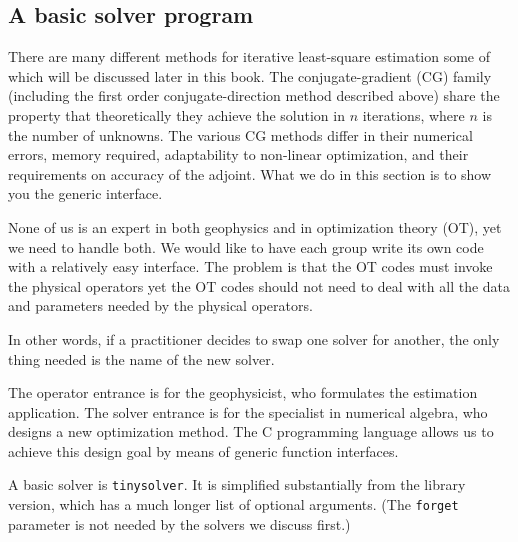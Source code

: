 \subsection{A basic solver program}
There are many different methods for iterative least-square estimation
some of which will be discussed later in this book.
The conjugate-gradient (CG) family
(including the first order conjugate-direction method described above)
share the property that theoretically they achieve the solution
in $n$ iterations, where $n$ is the number of unknowns.
The various CG methods differ
in their numerical errors,
memory required,
adaptability to non-linear optimization,
and their requirements on accuracy of the adjoint.
What we do in this section is to show you the generic interface.
\par
None of us is an expert in both geophysics and in optimization theory (OT),
yet we need to handle both.
We would like to have each group write its own code with
a relatively easy interface.
The problem is that the OT codes must invoke the physical operators
yet the OT codes should not
need to deal with all the data and parameters needed by the physical operators.
\par
In other words,
if a practitioner decides to
swap one solver for another,
the only thing needed is the name of the new solver.
\par
The operator entrance is for the geophysicist,
who formulates the estimation application.
The solver entrance is for the specialist in numerical algebra,
who designs a new optimization method.
The C programming language allows us
to achieve this design goal by means of generic function interfaces.
\par
A basic solver is \texttt{tinysolver}. It is simplified substantially from the library version,
which has a much longer list of optional arguments. (The \texttt{forget} parameter
is not needed by the solvers we discuss first.)


